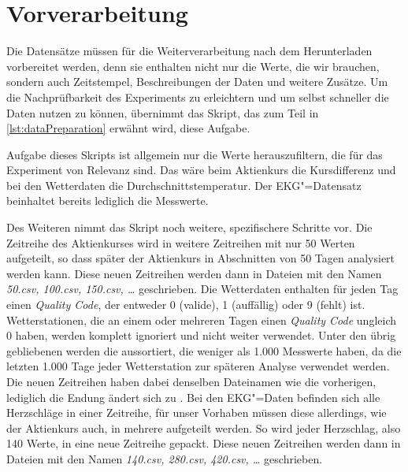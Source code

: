 \section{Vorverarbeitung}
Die Datensätze müssen für die Weiterverarbeitung nach dem Herunterladen vorbereitet werden, denn sie enthalten nicht nur die Werte, die wir brauchen, sondern auch Zeitstempel, Beschreibungen der Daten und weitere Zusätze. Um die Nachprüfbarkeit des Experiments zu erleichtern und um selbst schneller die Daten nutzen zu können, übernimmt das Skript, das zum Teil in \autoref{lst:dataPreparation} erwähnt wird, diese Aufgabe.

Aufgabe dieses Skripts ist allgemein nur die Werte herauszufiltern, die für das Experiment von Relevanz sind. Das wäre beim Aktienkurs die Kursdifferenz und bei den Wetterdaten die Durchschnittstemperatur. Der EKG"=Datensatz beinhaltet bereits lediglich die Messwerte. 

Des Weiteren nimmt das Skript noch weitere, spezifischere Schritte vor. Die Zeitreihe des Aktienkurses wird in weitere Zeitreihen mit nur 50 Werten aufgeteilt, so dass später der Aktienkurs in Abschnitten von 50 Tagen analysiert werden kann. Diese neuen Zeitreihen werden dann in Dateien mit den Namen \textit{50.csv, 100.csv, 150.csv, \dots} geschrieben. Die Wetterdaten enthalten für jeden Tag einen \textit{Quality Code}, der entweder 0 (valide), 1 (auffällig) oder 9 (fehlt) ist. Wetterstationen, die an einem oder mehreren Tagen einen \textit{Quality Code} ungleich 0 haben, werden komplett ignoriert und nicht weiter verwendet. Unter den übrig gebliebenen werden die aussortiert, die weniger als 1.000 Messwerte haben, da die letzten 1.000 Tage jeder Wetterstation zur späteren Analyse verwendet werden. Die neuen Zeitreihen haben dabei denselben Dateinamen wie die vorherigen, lediglich die Endung ändert sich zu . Bei den EKG"=Daten befinden sich alle Herzschläge in einer Zeitreihe, für unser Vorhaben müssen diese allerdings, wie der Aktienkurs auch, in mehrere aufgeteilt werden. So wird jeder Herzschlag, also 140 Werte, in eine neue Zeitreihe gepackt. Diese neuen Zeitreihen werden dann in Dateien mit den Namen \textit{140.csv, 280.csv, 420.csv, \dots} geschrieben.